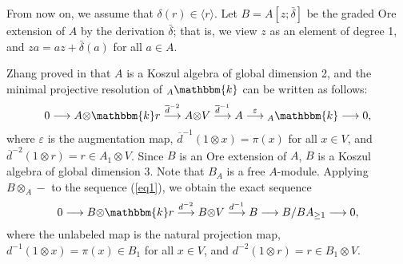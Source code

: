 \documentclass[a4paper]{amsart}
\begin{document}
From now on, we assume that $\delta(r)\in\langle r\rangle$. Let $B=A[z;\bar{\delta}]$ be the graded Ore extension of $A$ by the derivation $\bar{\delta}$; that is, we view $z$ as an element of degree 1, and $za=az+\bar{\delta}(a)$ for all $a\in A$.

Zhang proved in \cite{Z} that $A$ is a Koszul algebra of global dimension 2, and the minimal projective resolution of ${}_A{\mathbbm{k}}$ can be written as follows:
\begin{equation}\label{eq1}
   0\longrightarrow A{\otimes} {\mathbbm{k}} r\overset{\overline{d}^{-2}}\longrightarrow A{\otimes} V\overset{\overline{d}^{-1}}\longrightarrow A\overset{\varepsilon}\longrightarrow{}_A{\mathbbm{k}}\longrightarrow0,
\end{equation}
where $\varepsilon$ is the augmentation map, $\overline{d}^{-1}(1{\otimes} x)=\pi(x)$ for all $x\in V$, and $\overline{d}^{-2}(1{\otimes} r)=r\in A_1{\otimes} V$. Since $B$ is an Ore extension of $A$, $B$ is a Koszul algebra of global dimension 3.
Note that $B_A$ is a free $A$-module. Applying $B{\otimes}_A-$ to the sequence (\ref{eq1}), we obtain the exact sequence
\begin{equation}\label{eq2}
    0\longrightarrow B{\otimes}{\mathbbm{k}} r\overset{d^{-2}}\longrightarrow B{\otimes} V\overset{d^{-1}}\longrightarrow B\longrightarrow B/BA_{\ge1}\longrightarrow0,
\end{equation} where the unlabeled map is the natural projection map, $d^{-1}(1{\otimes} x)=\pi(x)\in B_1$ for all $x\in V$, and $d^{-2}(1{\otimes} r)=r\in B_1{\otimes} V$.
\end{document}
